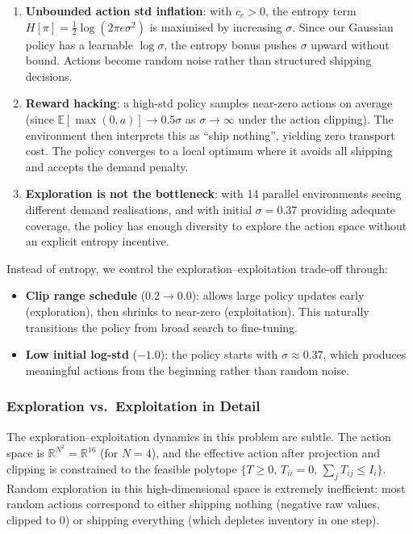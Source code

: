 \documentclass[11pt]{article}
\begin{document}
\begin{enumerate}[nosep]
    \item \textbf{Unbounded action std inflation}: with $c_e > 0$, the entropy term $H[\pi] = \frac{1}{2}\log(2\pi e \sigma^2)$ is maximised by increasing $\sigma$. Since our Gaussian policy has a learnable $\log \sigma$, the entropy bonus pushes $\sigma$ upward without bound. Actions become random noise rather than structured shipping decisions.

    \item \textbf{Reward hacking}: a high-std policy samples near-zero actions on average (since $\mathbb{E}[\max(0, a)] \to 0.5\sigma$ as $\sigma \to \infty$ under the action clipping). The environment then interprets this as ``ship nothing'', yielding zero transport cost. The policy converges to a local optimum where it avoids all shipping and accepts the demand penalty.

    \item \textbf{Exploration is not the bottleneck}: with 14 parallel environments seeing different demand realisations, and with initial $\sigma = 0.37$ providing adequate coverage, the policy has enough diversity to explore the action space without an explicit entropy incentive.
\end{enumerate}

Instead of entropy, we control the exploration--exploitation trade-off through:
\begin{itemize}[nosep]
    \item \textbf{Clip range schedule} ($0.2 \to 0.0$): allows large policy updates early (exploration), then shrinks to near-zero (exploitation). This naturally transitions the policy from broad search to fine-tuning.
    \item \textbf{Low initial log-std} ($-1.0$): the policy starts with $\sigma \approx 0.37$, which produces meaningful actions from the beginning rather than random noise.
\end{itemize}

\subsubsection{Exploration vs.\ Exploitation in Detail}

The exploration--exploitation dynamics in this problem are subtle. The action space is $\mathbb{R}^{N^2} = \mathbb{R}^{16}$ (for $N=4$), and the effective action after projection and clipping is constrained to the feasible polytope $\{T \geq 0,\, T_{ii}=0,\, \sum_j T_{ij} \leq I_i\}$. Random exploration in this high-dimensional space is extremely inefficient: most random actions correspond to either shipping nothing (negative raw values, clipped to 0) or shipping everything (which depletes inventory in one step).
\end{document}
